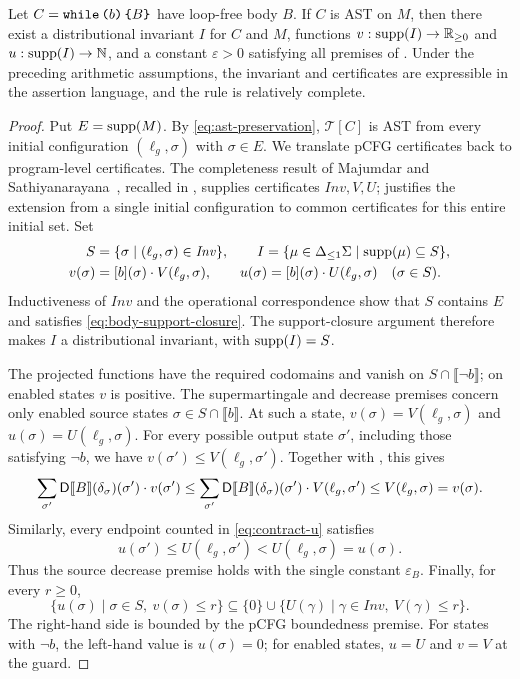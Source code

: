 \begin{theorem}
\label{thm:complete}
Let $C=\textnormal{\texttt{while}}\,\textnormal{\texttt{(}} b\textnormal{\texttt{)}}\,\textnormal{\texttt{\{}} B\textnormal{\texttt{\}}}$ have loop-free body $B$. If $C$ is AST on $M$, then
there exist a distributional invariant $I$ for $C$ and $M$,
functions $v:\textnormal{supp}(I)\to\mathbb R_{\geq0}$ and
$u:\textnormal{supp}(I)\to\mathbb N$, and a constant $\varepsilon>0$
satisfying all premises of .
Under the preceding arithmetic assumptions, the invariant and
certificates are expressible in the assertion language, and the rule
is relatively complete.
\end{theorem}
\begin{proof}
Put $E=\textnormal{supp}(M)$. By \eqref{eq:ast-preservation}, $\mathcal T[C]$ is
AST from every initial configuration $(\ell_g,\sigma)$ with $\sigma\in E$.
We translate pCFG certificates back to program-level certificates.
The completeness result of Majumdar and
Sathiyanarayana~\cite{DBLP:journals/pacmpl/MajumdarS25}, recalled in
, supplies certificates $\mathit{Inv},V,U$;
 justifies the extension from a single initial
configuration to common certificates for this entire initial set. Set
\begin{equation}
 \begin{split}
 S&=\{\sigma\mid(\ell_g,\sigma)\in\mathit{Inv}\},\qquad
 I=\{\mu\in{\Delta_{\leq 1}\Sigma}\mid\textnormal{supp}(\mu)\subseteq S\},\\
 v(\sigma)&=[b](\sigma) \cdot V(\ell_g,\sigma),\qquad
 u(\sigma)=[b](\sigma) \cdot U(\ell_g,\sigma)\quad(\sigma\in S).
 \end{split}
 \label{eq:project-certificates}
\end{equation}
Inductiveness of $\mathit{Inv}$ and the operational correspondence show
that $S$ contains $E$ and satisfies \eqref{eq:body-support-closure}.
The support-closure argument therefore makes $I$ a distributional invariant, with
$\textnormal{supp}(I)=S$.

The projected functions have the required codomains and vanish on
$S\cap\llbracket\neg b\rrbracket$; on enabled states $v$ is positive.
The supermartingale and decrease premises concern only enabled source
states $\sigma\in S\cap\llbracket b\rrbracket$. At such a state,
$v(\sigma)=V(\ell_g,\sigma)$ and $u(\sigma)=U(\ell_g,\sigma)$.
For every possible output state $\sigma'$, including those satisfying
$\neg b$, we have $v(\sigma')\leq V(\ell_g,\sigma')$.
Together with , this gives
\[
 \sum_{\sigma'}\mathsf{D}\llbracket B\rrbracket(\delta_{\sigma})(\sigma')\cdot v(\sigma')
 \leq\sum_{\sigma'}\mathsf{D}\llbracket B\rrbracket(\delta_{\sigma})(\sigma')
                         \cdot V(\ell_g,\sigma')
 \leq V(\ell_g,\sigma)=v(\sigma).
\]
Similarly, every endpoint counted in \eqref{eq:contract-u} satisfies
\[
 u(\sigma')\leq U(\ell_g,\sigma')
   <U(\ell_g,\sigma)=u(\sigma).
\]
Thus the source decrease premise holds with the single constant
$\varepsilon_B$. Finally, for every $r\geq0$,
\[
 \{u(\sigma)\mid\sigma\in S,\ v(\sigma)\leq r\}
 \subseteq\{0\}\cup
 \{U(\gamma)\mid\gamma\in\mathit{Inv},\ V(\gamma)\leq r\}.
\]
The right-hand side is bounded by the pCFG boundedness premise.
For states with $\neg b$, the left-hand value is $u(\sigma)=0$;
for enabled states, $u=U$ and $v=V$ at the guard.


\end{proof}
